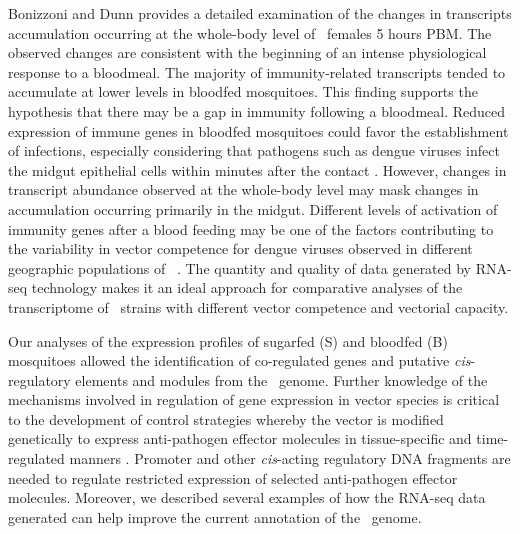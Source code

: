 Bonizzoni and Dunn \cite{Bonizzoni2011} provides a detailed examination of the changes in transcripts accumulation occurring at the whole-body level of \Aa\  females 5 hours \gls{PBM}. The observed changes are consistent with the beginning of an intense physiological response to a bloodmeal. The majority of immunity-related transcripts tended to accumulate at lower levels in bloodfed mosquitoes. This finding supports the hypothesis that there may be a gap in immunity following a bloodmeal. Reduced expression of immune genes in bloodfed mosquitoes could favor the establishment of infections, especially considering that pathogens such as dengue viruses infect the midgut epithelial cells within minutes after the contact \cite{Salazar2007}. However, changes in transcript abundance observed at the whole-body level may mask changes in accumulation occurring primarily in the midgut. Different levels of activation of immunity genes after a blood feeding may be one of the factors contributing to the variability in vector competence for dengue viruses observed in different geographic populations of \Aa\  \cite{Bennett2002,Black2002}. The quantity and quality of data generated by RNA-seq technology makes it an ideal approach for comparative analyses of the transcriptome of \Aa\ strains with different vector competence and vectorial capacity.

Our analyses of the expression profiles of sugarfed (S) and bloodfed (B) mosquitoes allowed the identification of co-regulated genes and putative \textit{cis}-regulatory elements and modules from the \Aa\  genome. Further knowledge of the mechanisms involved in regulation of gene expression in vector species is critical to the development of control strategies whereby the vector is modified genetically to express anti-pathogen effector molecules in tissue-specific and time-regulated manners \cite{Terenius2008}. Promoter and other \textit{cis}-acting regulatory DNA fragments are needed to regulate restricted expression of selected anti-pathogen effector molecules. Moreover, we described several examples of how the RNA-seq data generated can help improve the current annotation of the \Aa\  genome.

